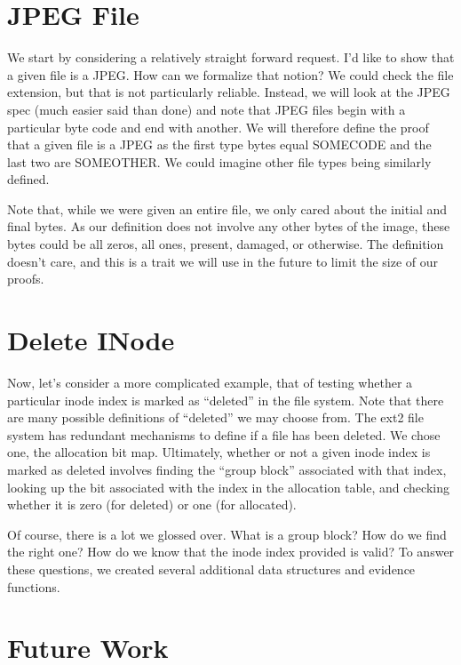 \documentclass{sigplanconf}
\begin{document}
\section{JPEG File}

We start by considering a relatively straight forward request. I'd like to
show that a given file is a JPEG. How can we formalize that notion? We could
check the file extension, but that is not particularly reliable. Instead, we
will look at the JPEG spec (much easier said than done) and note that JPEG
files begin with a particular byte code and end with another. We will
therefore define the proof that a given file is a JPEG as the first type bytes
equal SOMECODE and the last two are SOMEOTHER. We could imagine other file
types being similarly defined.

Note that, while we were given an entire file, we only cared about the initial
and final bytes. As our definition does not involve any other bytes of the
image, these bytes could be all zeros, all ones, present, damaged, or
otherwise. The definition doesn't care, and this is a trait we will use in the
future to limit the size of our proofs.

\section{Delete INode}

Now, let's consider a more complicated example, that of testing whether a
particular inode index is marked as ``deleted'' in the file system. Note that
there are many possible definitions of ``deleted'' we may choose from. The
ext2 file system has redundant mechanisms to define if a file has been
deleted. We chose one, the allocation bit map. Ultimately, whether or not a
given inode index is marked as deleted involves finding the ``group block''
associated with that index, looking up the bit associated with the index in
the allocation table, and checking whether it is zero (for deleted) or one
(for allocated).

Of course, there is a lot we glossed over. What is a group block? How do we
find the right one? How do we know that the inode index provided is valid? To
answer these questions, we created several additional data structures and
evidence functions.

\section{Future Work}
\end{document}
